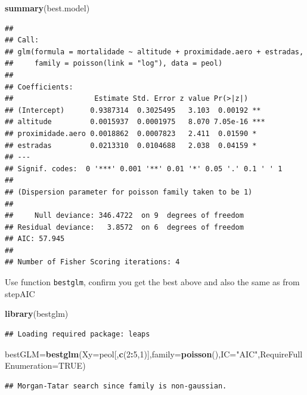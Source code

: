 \documentclass[
]{book}
\newenvironment{Shaded}{\begin{snugshade}}{\end{snugshade}}
\newcommand{\AttributeTok}[1]{\textcolor[rgb]{0.13,0.29,0.53}{#1}}
\newcommand{\ConstantTok}[1]{\textcolor[rgb]{0.56,0.35,0.01}{#1}}
\newcommand{\DecValTok}[1]{\textcolor[rgb]{0.00,0.00,0.81}{#1}}
\newcommand{\FunctionTok}[1]{\textcolor[rgb]{0.13,0.29,0.53}{\textbf{#1}}}
\newcommand{\NormalTok}[1]{#1}
\newcommand{\OtherTok}[1]{\textcolor[rgb]{0.56,0.35,0.01}{#1}}
\newcommand{\SpecialCharTok}[1]{\textcolor[rgb]{0.81,0.36,0.00}{\textbf{#1}}}
\newcommand{\StringTok}[1]{\textcolor[rgb]{0.31,0.60,0.02}{#1}}
\begin{document}
\begin{Shaded}
\begin{Highlighting}[]
\FunctionTok{summary}\NormalTok{(best.model)}
\end{Highlighting}
\end{Shaded}

\begin{verbatim}
## 
## Call:
## glm(formula = mortalidade ~ altitude + proximidade.aero + estradas, 
##     family = poisson(link = "log"), data = peol)
## 
## Coefficients:
##                   Estimate Std. Error z value Pr(>|z|)    
## (Intercept)      0.9387314  0.3025495   3.103  0.00192 ** 
## altitude         0.0015937  0.0001975   8.070 7.05e-16 ***
## proximidade.aero 0.0018862  0.0007823   2.411  0.01590 *  
## estradas         0.0213310  0.0104688   2.038  0.04159 *  
## ---
## Signif. codes:  0 '***' 0.001 '**' 0.01 '*' 0.05 '.' 0.1 ' ' 1
## 
## (Dispersion parameter for poisson family taken to be 1)
## 
##     Null deviance: 346.4722  on 9  degrees of freedom
## Residual deviance:   3.8572  on 6  degrees of freedom
## AIC: 57.945
## 
## Number of Fisher Scoring iterations: 4
\end{verbatim}

Use function \texttt{bestglm}, confirm you get the best above and also the same as from stepAIC

\begin{Shaded}
\begin{Highlighting}[]
\FunctionTok{library}\NormalTok{(bestglm)}
\end{Highlighting}
\end{Shaded}

\begin{verbatim}
## Loading required package: leaps
\end{verbatim}

\begin{Shaded}
\begin{Highlighting}[]
\NormalTok{bestGLM}\OtherTok{=}\FunctionTok{bestglm}\NormalTok{(}\AttributeTok{Xy=}\NormalTok{peol[,}\FunctionTok{c}\NormalTok{(}\DecValTok{2}\SpecialCharTok{:}\DecValTok{5}\NormalTok{,}\DecValTok{1}\NormalTok{)],}\AttributeTok{family=}\FunctionTok{poisson}\NormalTok{(),}\AttributeTok{IC=}\StringTok{"AIC"}\NormalTok{,}\AttributeTok{RequireFullEnumeration=}\ConstantTok{TRUE}\NormalTok{)}
\end{Highlighting}
\end{Shaded}

\begin{verbatim}
## Morgan-Tatar search since family is non-gaussian.
\end{verbatim}
\end{document}
